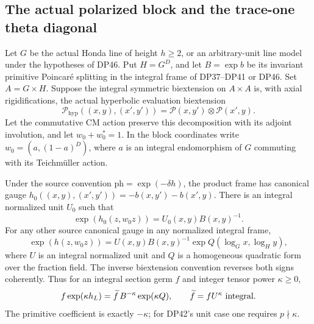 \subsection{The actual polarized block and the trace-one theta diagonal}

\begin{proposition}\label{DP47}
Let $G$ be the actual Honda line of height $h\ge2$, or an arbitrary-unit line model under the hypotheses of DP46. Put $H=G^D$, and let
$B=\exp b$ be its invariant primitive Poincar\'e splitting in the integral frame of DP37--DP41 or DP46. Set $A=G\times H$. Suppose the integral symmetric biextension on $A\times A$ is, with axial rigidifications, the actual hyperbolic evaluation biextension
\[
 \mathcal P_{\mathrm{hyp}}((x,y),(x',y'))
       =\mathcal P(x,y')\otimes\mathcal P(x',y).
\]
Let the commutative CM action preserve this decomposition with its adjoint involution, and let $w_0+w_0^*=1$. In the block coordinates write
$w_0=(a,(1-a)^D)$, where $a$ is an integral endomorphism of $G$ commuting with its Teichm\"uller action.

Under the source convention $\mathrm{ph}=\exp(-\delta h)$, the product frame has canonical gauge
$h_0((x,y),(x',y'))=-b(x,y')-b(x',y)$.
There is an integral normalized unit $U_0$ such that
\[
 \exp(h_0(z,w_0z))=U_0(x,y)B(x,y)^{-1}.
\]
For any other source canonical gauge in any normalized integral frame,
\begin{equation}\label{eq:hyperbolicpullback}
 \exp(h(z,w_0z))=U(x,y)B(x,y)^{-1}
                       \exp Q(\log_Gx,\log_Hy),
\end{equation}
where $U$ is an integral normalized unit and $Q$ is a homogeneous quadratic form over the fraction field.
The inverse biextension convention reverses both signs coherently.
Thus for an integral section germ $f$ and integer tensor power $\kappa\ge0$,
\[
 f\exp(\kappa h_L)=\widetilde f\,B^{-\kappa}\exp(\kappa Q),
 \qquad \widetilde f=fU^\kappa\ \hbox{integral}.
\]
The primitive coefficient is exactly $-\kappa$; for DP42's unit case one requires $p\nmid\kappa$.
\end{proposition}

